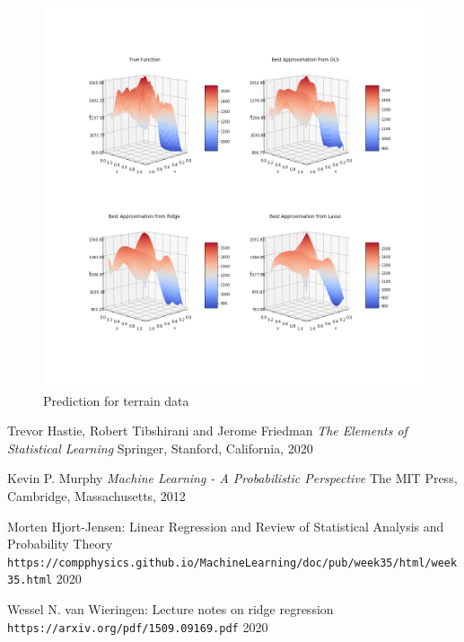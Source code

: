 \documentclass{article}
\begin{document}
\begin{figure}[h]\centering
\includegraphics[scale=0.4]{Plots/PlotsRealData.png}
\caption{Prediction for terrain data}
\label{fig:realDataPlot}
\end{figure}

\clearpage

\begin{thebibliography}{3}
Trevor Hastie, Robert Tibshirani and Jerome Friedman
\textit{The Elements of Statistical Learning}
Springer, Stanford, California, 2020

Kevin P. Murphy
\textit{Machine Learning - A Probabilistic Perspective}
The MIT Press, Cambridge, Massachusetts, 2012

Morten Hjort-Jensen: Linear Regression and Review of Statistical Analysis and Probability Theory 
\\\texttt{https://compphysics.github.io/MachineLearning/doc/pub/week35/html/week35.html}
2020

Wessel N. van Wieringen: Lecture notes on ridge regression
\\\texttt{https://arxiv.org/pdf/1509.09169.pdf}
2020

\end{thebibliography}
\end{document}
